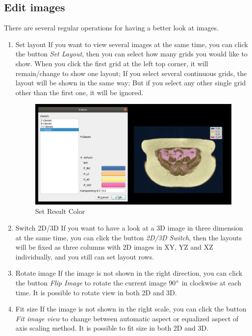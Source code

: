 \documentclass[12pt]{article}
\begin{document}
\subsection{Edit images}
There are several regular operations for having a better look at images.
\begin{enumerate}
	\item Set layout
	\newline If you want to view several images at the same time, you can click the button \textit{Set Layout}, then you can select how many grids you would like to show. When you click the first grid at the left top corner, it will remain/change to show one layout; If you select several continuous grids, the layout will be shown in the same way; But if you select any other single grid other than the first one, it will be ignored. 
	\begin{figure}[htbp]	
		\centering
		\includegraphics[width=\textwidth]{set_result_color.png}
		\caption[Set Result Color]{Set Result Color}
		\label{fig:set_result_color}
	\end{figure}
	\item Switch 2D/3D
	\newline If you want to have a look at a 3D image in three dimension at the same time, you can click the button \textit{2D/3D Switch}, then the layouts will be fixed as three columns with 2D images in XY, YZ and XZ individually, and you still can set layout rows.
	\item Rotate image
	\newline If the image is not shown in the right direction, you can click the button \textit{Flip Image} to rotate the current image 90$\degree$ in clockwise at each time. It is possible to rotate view in both 2D and 3D.
	\item Fit size
	\newline If the image is not shown in the right scale, you can click the button \textit{Fit image view} to change between automatic aspect or equalized aspect of axis scaling method. It is possible to fit size in both 2D and 3D.

\end{enumerate}
\end{document}
